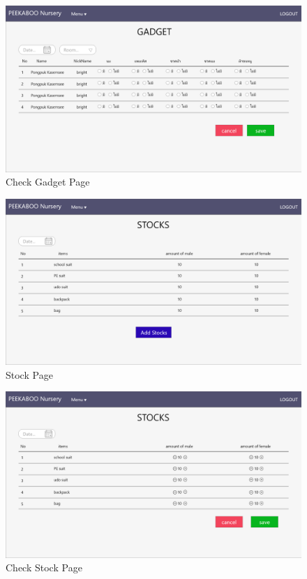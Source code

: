 \begin{figure}
  \begin{center}
  \includegraphics[width=140mm]{images/gadgetPageChecking.png}
  \end{center}
  \caption[Poem]{Check Gadget Page}
  \label{fig:walrus}
  \end{figure}

\begin{figure}
  \begin{center}
  \includegraphics[width=140mm]{images/stockPage.png}
  \end{center}
  \caption[Poem]{Stock Page}
  \label{fig:walrus}
  \end{figure}

\begin{figure}
  \begin{center}
  \includegraphics[width=140mm]{images/stockPageChecking.png}
  \end{center}
  \caption[Poem]{Check Stock Page}
  \label{fig:walrus}
  \end{figure}

